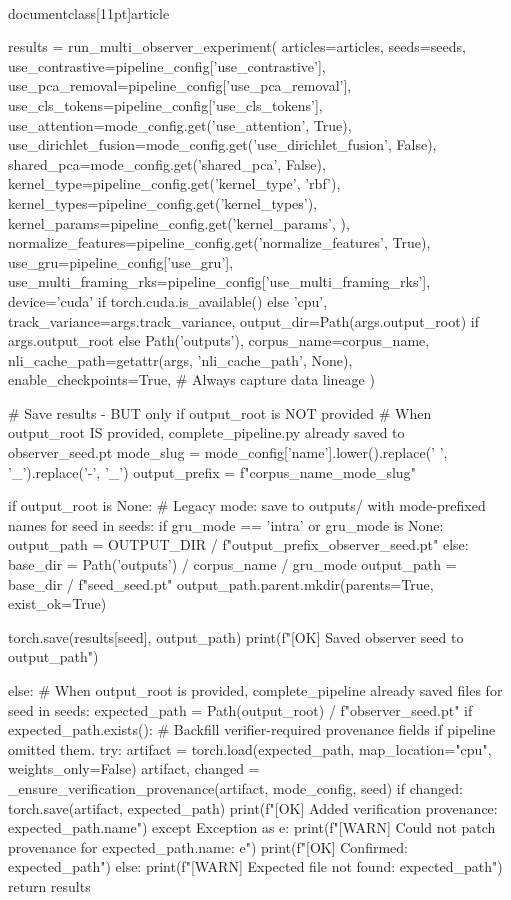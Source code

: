 \\documentclass[11pt]{article}
\begin{document}
\begin{CodeBlock}
    results = run_multi_observer_experiment(
        articles=articles,
        seeds=seeds,
        use_contrastive=pipeline_config['use_contrastive'],
        use_pca_removal=pipeline_config['use_pca_removal'],
        use_cls_tokens=pipeline_config['use_cls_tokens'],
        use_attention=mode_config.get('use_attention', True),
        use_dirichlet_fusion=mode_config.get('use_dirichlet_fusion', False),
        shared_pca=mode_config.get('shared_pca', False),
        kernel_type=pipeline_config.get('kernel_type', 'rbf'),
        kernel_types=pipeline_config.get('kernel_types'),
        kernel_params=pipeline_config.get('kernel_params', {}),
        normalize_features=pipeline_config.get('normalize_features', True),
        use_gru=pipeline_config['use_gru'],
        use_multi_framing_rks=pipeline_config['use_multi_framing_rks'],
        device='cuda' if torch.cuda.is_available() else 'cpu',
        track_variance=args.track_variance,
        output_dir=Path(args.output_root) if args.output_root else Path('outputs'),
        corpus_name=corpus_name,
        nli_cache_path=getattr(args, 'nli_cache_path', None),
        enable_checkpoints=True, # Always capture data lineage
    )
    
    # Save results - BUT only if output_root is NOT provided
    # When output_root IS provided, complete_pipeline.py already saved to observer_{seed}.pt
    mode_slug = mode_config['name'].lower().replace(' ', '_').replace('-', '_')
    output_prefix = f"{corpus_name}_{mode_slug}"
    
    if output_root is None:
        # Legacy mode: save to outputs/ with mode-prefixed names
        for seed in seeds:
            if gru_mode == 'intra' or gru_mode is None:
                output_path = OUTPUT_DIR / f"{output_prefix}_observer_{seed}.pt"
            else:
                base_dir = Path('outputs') / corpus_name / gru_mode
                output_path = base_dir / f"seed_{seed}.pt"
                output_path.parent.mkdir(parents=True, exist_ok=True)

            torch.save(results[seed], output_path)
            print(f"[OK] Saved observer {seed} to {output_path}")
    
    else:
        # When output_root is provided, complete_pipeline already saved files
        for seed in seeds:
            expected_path = Path(output_root) / f"observer_{seed}.pt"
            if expected_path.exists():
                # Backfill verifier-required provenance fields if pipeline omitted them.
                try:
                    artifact = torch.load(expected_path, map_location="cpu", weights_only=False)
                    artifact, changed = _ensure_verification_provenance(artifact, mode_config, seed)
                    if changed:
                        torch.save(artifact, expected_path)
                        print(f"[OK] Added verification provenance: {expected_path.name}")
                except Exception as e:
                    print(f"[WARN] Could not patch provenance for {expected_path.name}: {e}")
                print(f"[OK] Confirmed: {expected_path}")
            else:
                print(f"[WARN] Expected file not found: {expected_path}")
    return results



\end{CodeBlock}
\end{document}
